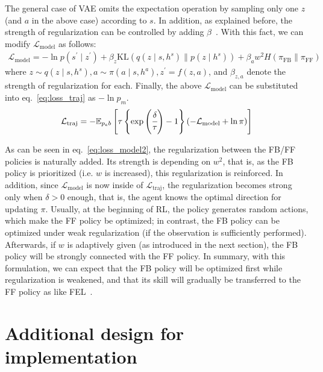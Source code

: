 \documentclass{bmcart}
\begin{document}
The general case of VAE omits the expectation operation by sampling only one $z$ (and $a$ in the above case) according to $s$.
In addition, as explained before, the strength of regularization can be controlled by adding $\beta$~\cite{higgins2017beta}.
With this fact, we can modify $\mathcal{L}_\mathrm{model}$ as follows:
\begin{align}
    \mathcal{L}_\mathrm{model} = - \ln p(s^\prime \mid z^\prime)
    + \beta_z \mathrm{KL}(q(z \mid s, h^s) \| p(z \mid h^s))
    + \beta_a w^2 H(\pi_\mathrm{FB} \| \pi_\mathrm{FF})
    \label{eq:loss_model2}
\end{align}
where $z \sim q(z \mid s, h^s), a \sim \pi(a \mid s, h^a), z^\prime = f(z, a)$, and $\beta_{z,a}$ denote the strength of regularization for each.
Finally, the above $\mathcal{L}_\mathrm{model}$ can be substituted into eq.~\eqref{eq:loss_traj} as $- \ln p_m$.
\begin{align}
    \mathcal{L}_\mathrm{traj} = - \mathbb{E}_{p_e b}\left [ \tau \left \{\exp\left( \cfrac{\delta}{\tau} \right) - 1 \right \} (- \mathcal{L}_\mathrm{model} + \ln \pi) \right ]
    \label{eq:loss_traj2}
\end{align}

As can be seen in eq.~\eqref{eq:loss_model2}, the regularization between the FB/FF policies is naturally added.
Its strength is depending on $w^2$, that is, as the FB policy is prioritized (i.e. $w$ is increased), this regularization is reinforced.
In addition, since $\mathcal{L}_\mathrm{model}$ is now inside of $\mathcal{L}_\mathrm{traj}$, the regularization becomes strong only when $\delta > 0$ enough, that is, the agent knows the optimal direction for updating $\pi$.
Usually, at the beginning of RL, the policy generates random actions, which make the FF policy be optimized;
in contrast, the FB policy can be optimized under weak regularization (if the observation is sufficiently performed).
Afterwards, if $w$ is adaptively given (as introduced in the next section), the FB policy will be strongly connected with the FF policy.
In summary, with this formulation, we can expect that the FB policy will be optimized first while regularization is weakened, and that its skill will gradually be transferred to the FF policy as like FEL~\cite{miyamoto1988feedback}.

\section{Additional design for implementation}
\end{document}
